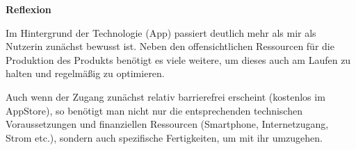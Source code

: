 \documentclass[
  a4paper,
]{book}
\begin{document}
\textbf{Reflexion}

Im Hintergrund der Technologie (App) passiert deutlich mehr als mir als Nutzerin zunächst bewusst ist. Neben den offensichtlichen Ressourcen für die Produktion des Produkts benötigt es viele weitere, um dieses auch am Laufen zu halten und regelmäßig zu optimieren.

Auch wenn der Zugang zunächst relativ barrierefrei erscheint (kostenlos im AppStore), so benötigt man nicht nur die entsprechenden technischen Voraussetzungen und finanziellen Ressourcen (Smartphone, Internetzugang, Strom etc.), sondern auch spezifische Fertigkeiten, um mit ihr umzugehen.

  
\end{document}

